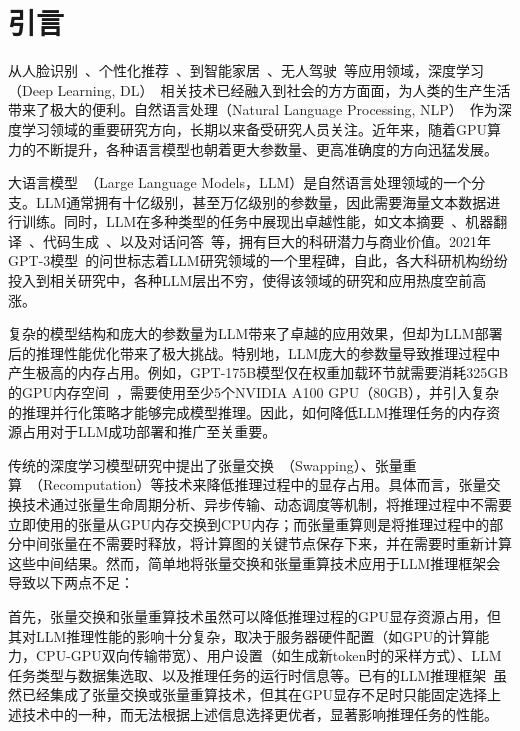 \section{引言}

从人脸识别~\cite{Face-Recognition}、个性化推荐~\cite{Personal-Recommendation}、到智能家居~\cite{Smart-Home}、无人驾驶~\cite{Self-Driving}等应用领域，深度学习（Deep Learning, DL）~\cite{Deep-Learning}相关技术已经融入到社会的方方面面，为人类的生产生活带来了极大的便利。自然语言处理（Natural Language Processing, NLP）~\cite{NLP}作为深度学习领域的重要研究方向，长期以来备受研究人员关注。近年来，随着GPU算力的不断提升，各种语言模型也朝着更大参数量、更高准确度的方向迅猛发展。

大语言模型~\cite{LLM}（Large Language Models，LLM）是自然语言处理领域的一个分支。LLM通常拥有十亿级别，甚至万亿级别的参数量，因此需要海量文本数据进行训练。同时，LLM在多种类型的任务中展现出卓越性能，如文本摘要~\cite{Text-Summarization}、机器翻译~\cite{Machine-Translation}、代码生成~\cite{Code-Generation}、以及对话问答~\cite{Question-Answer}等，拥有巨大的科研潜力与商业价值。2021年GPT-3模型~\cite{Text-Summarization, GPT3}的问世标志着LLM研究领域的一个里程碑，自此，各大科研机构纷纷投入到相关研究中，各种LLM层出不穷，使得该领域的研究和应用热度空前高涨。

复杂的模型结构和庞大的参数量为LLM带来了卓越的应用效果，但却为LLM部署后的推理性能优化带来了极大挑战。特别地，LLM庞大的参数量导致推理过程中产生极高的内存占用。例如，GPT-175B模型仅在权重加载环节就需要消耗325GB的GPU内存空间~\cite{GPT-175B资源消耗}，需要使用至少5个NVIDIA A100 GPU（80GB），并引入复杂的推理并行化策略才能够完成模型推理。因此，如何降低LLM推理任务的内存资源占用对于LLM成功部署和推广至关重要。

传统的深度学习模型研究中提出了张量交换~\cite{Swapping}（Swapping）、张量重算~\cite{Recomputation}（Recomputation）等技术来降低推理过程中的显存占用。具体而言，张量交换技术通过张量生命周期分析、异步传输、动态调度等机制，将推理过程中不需要立即使用的张量从GPU内存交换到CPU内存；而张量重算则是将推理过程中的部分中间张量在不需要时释放，将计算图的关键节点保存下来，并在需要时重新计算这些中间结果。然而，简单地将张量交换和张量重算技术应用于LLM推理框架会导致以下两点不足：

首先，张量交换和张量重算技术虽然可以降低推理过程的GPU显存资源占用，但其对LLM推理性能的影响十分复杂，取决于服务器硬件配置（如GPU的计算能力，CPU-GPU双向传输带宽）、用户设置（如生成新token时的采样方式）、LLM任务类型与数据集选取、以及推理任务的运行时信息等。已有的LLM推理框架~\cite{Swapping, vLLM, ORCA}虽然已经集成了张量交换或张量重算技术，但其在GPU显存不足时只能固定选择上述技术中的一种，而无法根据上述信息选择更优者，显著影响推理任务的性能。

